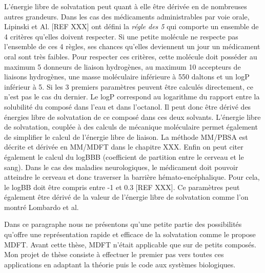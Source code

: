 L'énergie libre de solvatation peut quant à elle être dérivée en de nombreuses autres grandeurs. Dans les cas des médicaments administrables par voie orale, Lipinski et Al. [REF XXX] ont défini la \textit{régle des 5} qui comporte un ensemble de 4 critères qu'elles doivent respecter. Si une petite molécule ne respecte pas l'ensemble de ces 4 règles, ses chances qu'elles deviennent un jour un médicament oral sont très faibles. Pour respecter ces critères, cette molécule doit posséder au maximum 5 donneurs de liaison hydrogènes, au maximum 10 accepteurs de liaisons hydrogènes, une masse moléculaire inférieure à 550 daltons et un logP inférieur à 5. Si les 3 premiers paramètres peuvent être calculés directement, ce n'est pas le cas du dernier. Le logP correspond au logarithme du rapport entre la solubilité du composé dans l'eau et dans l'octanol. Il peut donc être dérivé des énergies libre de solvatation de ce composé dans ces deux solvants. L'énergie libre de solvatation, couplée à des calculs de mécanique moléculaire permet également de simplifier le calcul de l'énergie libre de liaison. La méthode MM/PBSA\cite{Genheden__MMPBSA_2015} est décrite et dérivée en MM/MDFT dans le chapitre XXX. Enfin on peut citer également le calcul du logBBB (coefficient de partition entre le cerveau et le sang). Dans le cas des maladies neurologiques, le médicament doit pouvoir atteindre le cerveau et donc traverser la barrière hémato-encéphalique. Pour cela, le logBB doit être compris entre -1 et 0.3 [REF XXX]. Ce paramètres peut également être dérivé de la valeur de l'énergie libre de solvatation comme l'on montré Lombardo et al\cite{Lombardo_computation_1996}.

Dans ce paragraphe nous ne présentons qu'une petite partie des possibilités qu'offre une représentation rapide et efficace de la solvatation comme le propose MDFT. Avant cette thèse, MDFT n'était applicable que sur de petits composés. Mon projet de thèse consiste à effectuer le premier pas vers toutes ces applications en adaptant la théorie puis le code aux systèmes biologiques.




\vspace{8\baselineskip}




